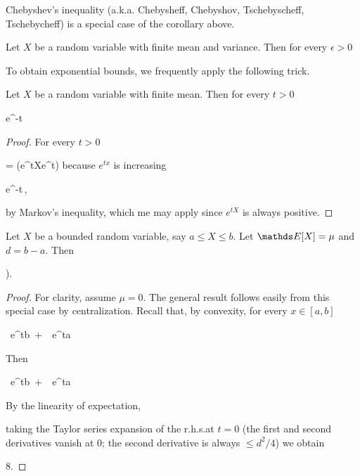\documentclass[scombinatorics.tex]{subfiles}
\begin{document}
Chebyshev's inequality (a.k.a. Chebysheff, Chebyshov, Tschebyscheff, Tschebycheff) is a special case of the corollary above.

\begin{void_thm}\label{Chebyshev}
    Let $X$ be a random variable with finite mean and variance.
    Then for every $\epsilon>0$
    
    {\le}
    {}\QED
\end{void_thm}

To obtain exponential bounds, we frequently apply the following trick.

\begin{void_thm}\label{lem_chernoff_method}
  Let $X$ be a random variable with finite mean.
  Then for every $t>0$

  {\le}
  {e^{-t\epsilon}\,\Ex\big[e^{tX}\big]}
\end{void_thm}

\begin{proof}
  For  every $t>0$

  {=}
  {\Pr\big(e^{tX}\ge e^{t\epsilon}\big)}
  \hfill because $e^{tx}$ is increasing
  
  \ceq{}
  {\le}
  {e^{-t\epsilon}\,\Ex\big[e^{tX}\big],}

  by Markov's inequality, which me may apply since $e^{tX}$ is always positive. 
\end{proof}


  \begin{void_thm}\label{lem_Hoeffding}
    Let $X$ be a bounded random variable, say $a\le X\le b$. 
    Let $\Ex[X]=\mu$ and $d=b-a$.
    Then
    
    \ceq{\hfill\Ex\Big[e^{t(X-\mu)}\Big]}
    {\le}
    {\Big).}\smallskip
  \end{void_thm}

\begin{proof}
  For clarity, assume $\mu=0$.
  The general result follows easily from this special case by centralization.
  Recall that, by convexity, for every $x\in[a,b]$

  {\le}
  {\ e^{tb}\ +\ \ e^{ta}}

  Then

  {\le}
  {\ e^{tb}\ +\ \ e^{ta}}

  By the linearity of expectation,

  \ceq{\hfill\Ex\Big[e^{tX}\Big]}
  {\le}
  {}

  \ceq{\hfill\log\Ex\Big[e^{tX}\Big]}
  {\le}
  {\log{}}

  taking the Taylor series expansion of the r.h.s.\@ at $t=0$ (the first and second derivatives vanish at $0$; the second derivative is always $\le d^2/4$) we obtain

  \ceq{\hfill\log\Ex\Big[e^{tX}\Big]}
  {\le}
  {8.}
\end{proof}
\end{document}
